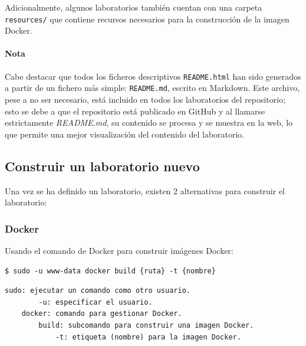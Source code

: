 \begin{appendices}
                Adicionalmente, algunos laboratorios también cuentan con una carpeta \texttt{resources/} que contiene recursos necesarios para la construcción de la imagen Docker.

                \paragraph{Nota}
                    
                    Cabe destacar que todos los ficheros descriptivos \texttt{README.html} han sido generados a partir de un fichero más simple: \texttt{README.md}, escrito en Markdown. Este archivo, pese a no ser necesario, está incluido en todos los laboratorios del repositorio; esto se debe a que el repositorio está publicado en GitHub y al llamarse estrictamente \textit{README.md}, su contenido se procesa y se muestra en la web, lo que permite una mejor visualización del contenido del laboratorio.

            \subsection{Construir un laboratorio nuevo}
                \label{sec:construir-laboratorio}

                Una vez se ha definido un laboratorio, existen 2 alternativas para construir el laboratorio:

                \subsubsection{Docker}

                    Usando el comando de Docker para construir imágenes Docker:
                    \\

                    \begin{lstlisting}[style=bash_style]
    $ sudo -u www-data docker build {ruta} -t {nombre}
                    \end{lstlisting}

                    \begin{lstlisting}[style=comment_style]
    sudo: ejecutar un comando como otro usuario.
        -u: especificar el usuario.
    docker: comando para gestionar Docker.
        build: subcomando para construir una imagen Docker.
            -t: etiqueta (nombre) para la imagen Docker.
                    \end{lstlisting}


\end{appendices}
